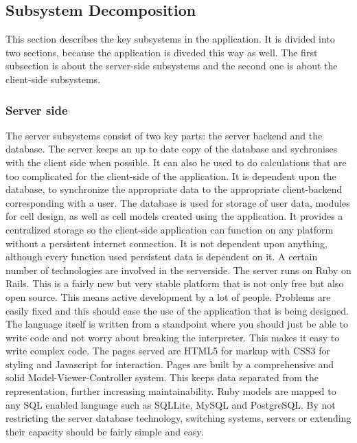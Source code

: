 \documentclass{report}
\begin{document}
		\subsection{Subsystem Decomposition}
			This section describes the key subsystems in the application. It is divided into two sections, because the application is diveded this way as well. The first subsection is about the server-side subsystems and the second one is about the client-side subsystems.
			\subsubsection{Server side}
				The server subsystems consist of two key parts: the server backend and the database. The server keeps an up to date copy of the database and sychronises with the client side when possible. It can also be used to do calculations that are too complicated for the client-side of the application. It is dependent upon the database, to synchronize the appropriate data to the appropriate client-backend corresponding with a user.
				The database is used for storage of user data, modules for cell design, as well as cell models created using the application. It provides a centralized storage so the client-side application can function on any platform without a persistent internet connection. It is not dependent upon anything, although every function used persistent data is dependent on it. 
				A certain number of technologies are involved in the serverside.
					The server runs on Ruby on Rails. This is a fairly new but very stable platform that is not only free but also open source. This means active development by a lot of people. Problems are easily fixed and this should ease the use of the application that is being designed. The language itself is written from a standpoint where you should just be able to write code and not worry about breaking the interpreter. This makes it easy to write complex code.
					The pages served are HTML5 for markup with CSS3 for styling and Javascript for interaction. Pages are built by a comprehensive and solid Model-Viewer-Controller system. This keeps data separated from the representation, further increasing maintainability. 
					Ruby models are mapped to any SQL enabled language such as SQLLite, MySQL and PostgreSQL. By not restricting the server database technology, switching systems, servers or extending  their capacity should be fairly simple and easy.
\end{document}
